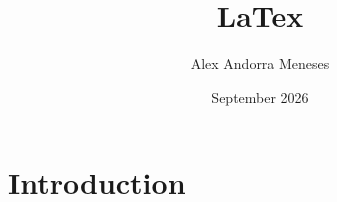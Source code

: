 \documentclass{article}
\title{LaTex}
\author{Alex Andorra Meneses}
\date{September 2026}
\begin{document}
\maketitle

\section{Introduction}
\end{document}
